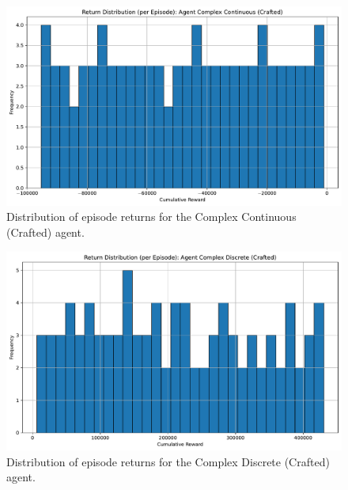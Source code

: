 \documentclass[sigconf]{acmart}
\begin{document}
\begin{figure}[t]
  \centering
  \includegraphics[width=\textwidth]{return_distribution_Complex Continuous (Crafted).pdf}
  \caption{Distribution of episode returns for the Complex Continuous (Crafted) agent.}
  \label{fig:return_distribution_Complex Continuous (Crafted)}
\end{figure}

\begin{figure}[t]
  \centering
  \includegraphics[width=\textwidth]{return_distribution_Complex Discrete (Crafted).pdf}
  \caption{Distribution of episode returns for the Complex Discrete (Crafted) agent.}
  \label{fig:return_distribution_Complex Discrete (Crafted)}
\end{figure}
\end{document}
